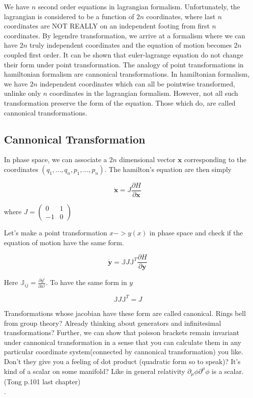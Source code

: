 \documentclass{report}
\begin{document}
We have $n$ second order equations in lagrangian formalism. Unfortunately, the lagrangian is considered to be a function of $2n$ coordinates, where last $n$ coordinates are NOT REALLY on an independent footing from first $n$ coordinates. By legendre transformation, we arrive at a formalism where we can have $2n$ truly independent coordinates and the equation of motion becomes $2n$ coupled first order. It can be shown that euler-lagrange equation do not change their form under point transformation. The analogy of point transformations in hamiltonian formalism are cannonical transformations. In hamiltonian formalism, we have $2n$ independent coordinates which can all be pointwise transformed, unlinke only $n$ coordinates in the lagrangian formalism. However, not all such transformation preserve the form of the equation. Those which do, are called cannonical transformations.

\subsection{Cannonical Transformation}

In phase space, we can associate a $2n$ dimensional vector $\boldsymbol{x}$ corresponding to the coordinates $(q_1,...,q_n,p_1,...,p_n)$. The hamilton's equation are then simply

$$\boldsymbol{\dot{x}} = J\frac{\partial H}{\partial \boldsymbol{x}}$$

\noindent where $ J = \begin{pmatrix}
  0 & 1\\
  -1 & 0
\end{pmatrix}$

\noindent Let's make a point transformation $x -> y(x)$ in phase space and check if the equation of motion have the same form.

$$\boldsymbol{\dot{y}} = \mathbb{J}J\mathbb{J}^T\frac{\partial H}{\partial \boldsymbol{y}}$$

\noindent Here $\mathbb{J}_{ij} = \frac{\partial y^i}{\partial x^j}$. To have the same form in $y$

$$\mathbb{J}J\mathbb{J}^T = J$$

\noindent Transformations whose jacobian have these form are called canonical. Rings bell from group theory? Already thinking about generators and infinitesimal transformations? Further, we can show that poisson brackets remain invariant under cannonical transformation in a sense that you can calculate them in any particular coordinate system(connected by cannonical transformation) you like. Don't they give you a feeling of dot product (quadratic form so to speak)? It's kind of a scalar on some manifold? Like in general relativity $\partial_\mu\phi\partial^\mu\phi$ is a scalar. (Tong p.101 last chapter)\\.
\end{document}
